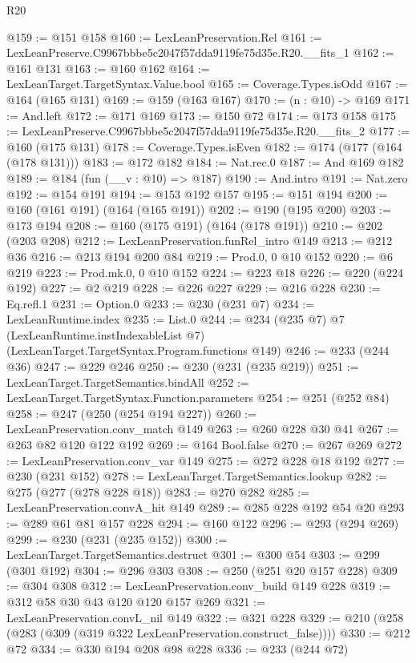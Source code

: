 \begin{lexlean}{R20}
\begin{coremodule}
@159 := @151 @158
@160 := LexLeanPreservation.Rel
@161 := LexLeanPreserve.C9967bbbe5c2047f57dda9119fe75d35e.R20.__fits_1
@162 := @161 @131
@163 := @160 @162
@164 := LexLeanTarget.TargetSyntax.Value.bool
@165 := Coverage.Types.isOdd
@167 := @164 (@165 @131)
@169 := @159 (@163 @167)
@170 := (n : @10) -> @169
@171 := And.left
@172 := @171 @169
@173 := @150 @72
@174 := @173 @158
@175 := LexLeanPreserve.C9967bbbe5c2047f57dda9119fe75d35e.R20.__fits_2
@177 := @160 (@175 @131)
@178 := Coverage.Types.isEven
@182 := @174 (@177 (@164 (@178 @131)))
@183 := @172 @182
@184 := Nat.rec.{0}
@187 := And @169 @182
@189 := @184 (fun (__v : @10) => @187)
@190 := And.intro
@191 := Nat.zero
@192 := @154 @191
@194 := @153 @192 @157
@195 := @151 @194
@200 := @160 (@161 @191) (@164 (@165 @191))
@202 := @190 (@195 @200)
@203 := @173 @194
@208 := @160 (@175 @191) (@164 (@178 @191))
@210 := @202 (@203 @208)
@212 := LexLeanPreservation.funRel_intro @149
@213 := @212 @36
@216 := @213 @194 @200 @84
@219 := Prod.{0, 0} @10 @152
@220 := @6 @219
@223 := Prod.mk.{0, 0} @10 @152
@224 := @223 @18
@226 := @220 (@224 @192)
@227 := @2 @219
@228 := @226 @227
@229 := @216 @228
@230 := Eq.refl.{1}
@231 := Option.{0}
@233 := @230 (@231 @7)
@234 := LexLeanRuntime.index
@235 := List.{0}
@244 := @234
    (@235 @7)
    @7
    (LexLeanRuntime.instIndexableList @7)
    (LexLeanTarget.TargetSyntax.Program.functions @149)
@246 := @233 (@244 @36)
@247 := @229 @246
@250 := @230 (@231 (@235 @219))
@251 := LexLeanTarget.TargetSemantics.bindAll
@252 := LexLeanTarget.TargetSyntax.Function.parameters
@254 := @251 (@252 @84)
@258 := @247 (@250 (@254 @194 @227))
@260 := LexLeanPreservation.conv_match @149
@263 := @260 @228 @30 @41
@267 := @263 @82 @120 @122 @192
@269 := @164 Bool.false
@270 := @267 @269
@272 := LexLeanPreservation.conv_var @149
@275 := @272 @228 @18 @192
@277 := @230 (@231 @152)
@278 := LexLeanTarget.TargetSemantics.lookup
@282 := @275 (@277 (@278 @228 @18))
@283 := @270 @282
@285 := LexLeanPreservation.convA_hit @149
@289 := @285 @228 @192 @54 @20
@293 := @289 @61 @81 @157 @228
@294 := @160 @122
@296 := @293 (@294 @269)
@299 := @230 (@231 (@235 @152))
@300 := LexLeanTarget.TargetSemantics.destruct
@301 := @300 @54
@303 := @299 (@301 @192)
@304 := @296 @303
@308 := @250 (@251 @20 @157 @228)
@309 := @304 @308
@312 := LexLeanPreservation.conv_build @149 @228
@319 := @312 @58 @30 @43 @120 @120 @157 @269
@321 := LexLeanPreservation.convL_nil @149
@322 := @321 @228
@329 := @210 (@258 (@283 (@309 (@319 @322 LexLeanPreservation.construct_false))))
@330 := @212 @72
@334 := @330 @194 @208 @98 @228
@336 := @233 (@244 @72)

\end{coremodule}
\end{lexlean}

